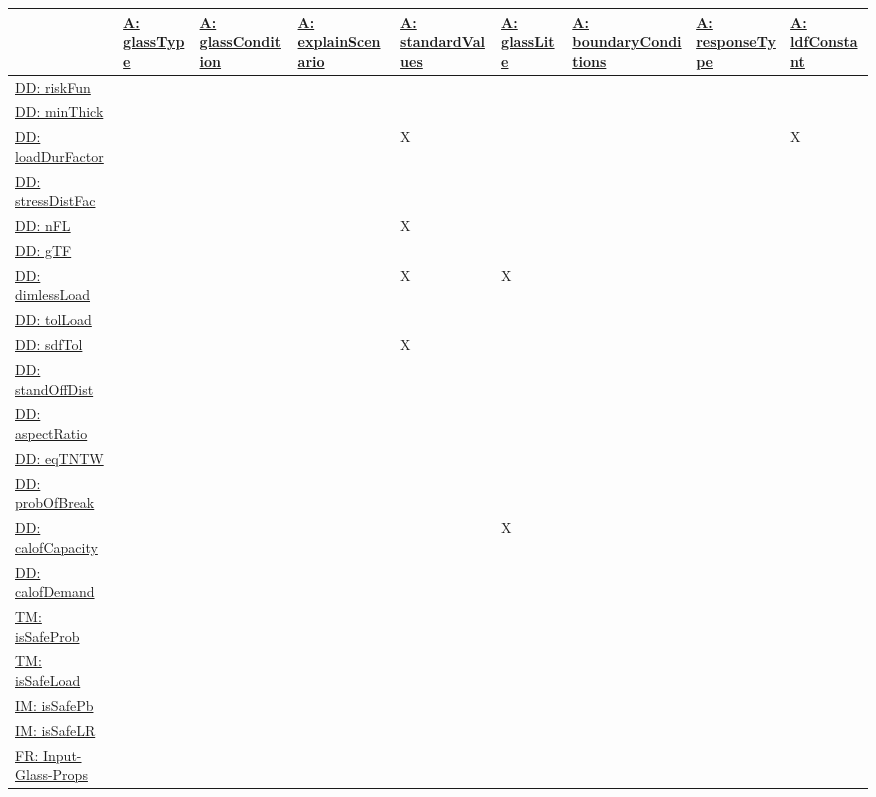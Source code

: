 \documentclass[12pt]{article}
\begin{document}
\begin{longtable}{l l l l l l l l l}
\toprule
\textbf{} & \textbf{\hyperref[assumpGT]{A: glassType}} & \textbf{\hyperref[assumpGC]{A: glassCondition}} & \textbf{\hyperref[assumpES]{A: explainScenario}} & \textbf{\hyperref[assumpSV]{A: standardValues}} & \textbf{\hyperref[assumpGL]{A: glassLite}} & \textbf{\hyperref[assumpBC]{A: boundaryConditions}} & \textbf{\hyperref[assumpRT]{A: responseType}} & \textbf{\hyperref[assumpLDFC]{A: ldfConstant}}
\\
\midrule
\endhead
\hyperref[DD:riskFun]{DD: riskFun} &  &  &  &  &  &  &  & 
\\
\hyperref[DD:minThick]{DD: minThick} &  &  &  &  &  &  &  & 
\\
\hyperref[DD:loadDurFactor]{DD: loadDurFactor} &  &  &  & X &  &  &  & X
\\
\hyperref[DD:stressDistFac]{DD: stressDistFac} &  &  &  &  &  &  &  & 
\\
\hyperref[DD:nFL]{DD: nFL} &  &  &  & X &  &  &  & 
\\
\hyperref[DD:gTF]{DD: gTF} &  &  &  &  &  &  &  & 
\\
\hyperref[DD:dimlessLoad]{DD: dimlessLoad} &  &  &  & X & X &  &  & 
\\
\hyperref[DD:tolLoad]{DD: tolLoad} &  &  &  &  &  &  &  & 
\\
\hyperref[DD:sdfTol]{DD: sdfTol} &  &  &  & X &  &  &  & 
\\
\hyperref[DD:standOffDist]{DD: standOffDist} &  &  &  &  &  &  &  & 
\\
\hyperref[DD:aspectRatio]{DD: aspectRatio} &  &  &  &  &  &  &  & 
\\
\hyperref[DD:eqTNTW]{DD: eqTNTW} &  &  &  &  &  &  &  & 
\\
\hyperref[DD:probOfBreak]{DD: probOfBreak} &  &  &  &  &  &  &  & 
\\
\hyperref[DD:calofCapacity]{DD: calofCapacity} &  &  &  &  & X &  &  & 
\\
\hyperref[DD:calofDemand]{DD: calofDemand} &  &  &  &  &  &  &  & 
\\
\hyperref[TM:isSafeProb]{TM: isSafeProb} &  &  &  &  &  &  &  & 
\\
\hyperref[TM:isSafeLoad]{TM: isSafeLoad} &  &  &  &  &  &  &  & 
\\
\hyperref[IM:isSafePb]{IM: isSafePb} &  &  &  &  &  &  &  & 
\\
\hyperref[IM:isSafeLR]{IM: isSafeLR} &  &  &  &  &  &  &  & 
\\
\hyperref[inputGlassProps]{FR: Input-Glass-Props} &  &  &  &  &  &  &  & 

\end{longtable}
\end{document}
